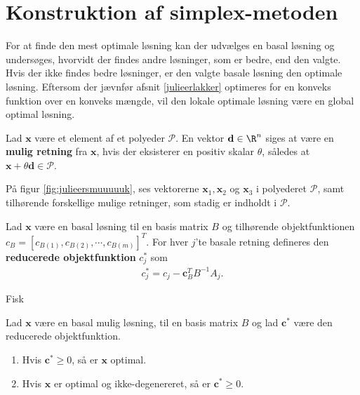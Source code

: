 %
\section{Konstruktion af simplex-metoden}
%
For at finde den mest optimale løsning kan der udvælges en basal løsning og undersøges, hvorvidt der findes andre løsninger, som er bedre, end den valgte. 
Hvis der ikke findes bedre løsninger, er den valgte basale løsning den optimale løsning. 
Eftersom der jævnfør afsnit \ref{julieerlakker} optimeres for en konveks funktion over en konveks mængde, %
vil den lokale optimale løsning være en global optimal løsning. 
%
%
\begin{defn}{}{}
Lad $\textbf{x}$ være et element af et polyeder $\mathcal{P}$.
En vektor $\textbf{d}\in \R^n$ siges at være en  \textbf{mulig retning} fra $\textbf{x}$, hvis der eksisterer en positiv skalar $\theta$, således at $\textbf{x}+\theta \textbf{d}\in \mathcal{P}$.
\end{defn}
\noindent
%
På figur \ref{fig:julieersmuuuuuk}, ses vektorerne $\mathbf{x}_1, \mathbf{x}_2$ og $\mathbf{x}_3$ i polyederet $\mathcal{P}$, samt tilhørende forskellige mulige retninger, som stadig er indholdt i $\mathcal{P}$.
%

%
%
%
\begin{defn}{}{}
Lad $\mathbf{x}$ være en basal løsning til en basis matrix $B$ og tilhørende objektfunktionen $c_B=[ c_{B(1)},c_{B(2)}, \cdots , c_{B(m)} ]^T.$
For hver $j$'te basale retning defineres den \textbf{reducerede objektfunktion} $c_j^*$ som
\begin{align*}
c_j^* = c_j - \mathbf{c}_B^T B^{-1}A_j.
\end{align*} 
%
\end{defn}
\noindent
%
Fisk
%
\begin{thm}{}{}
Lad $\mathbf{x}$ være en basal mulig løsning, til en basis matrix $B$ og lad $\mathbf{c}^*$ være den reducerede objektfunktion. 
\begin{enumerate}[label = (\alph*)]
\item Hvis $\mathbf{c}^* \geq 0$, så er $\mathbf{x}$ optimal.
\item Hvis $\mathbf{x}$ er optimal og ikke-degenereret, så er $\mathbf{c}^* \geq 0$.
\end{enumerate}
\end{thm}
